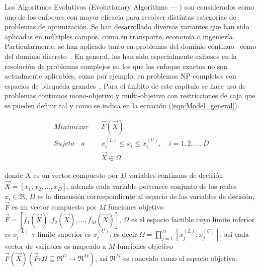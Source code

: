 Los Algoritmos Evolutivos (Evolutionary Algorithms --- \EAS{}) son considerados como uno de los enfoques con mayor eficacia para resolver distintas categorías de 
problemas de optimización.
%
Se han desarrollado diversas variantes que han sido aplicadas en múltiples campos, como en transporte, economía o ingeniería.
%
Particularmente, se han aplicado tanto en problemas del dominio continuo~\cite{glover2005handbook} como del dominio discreto~\cite{Joel:Dynamic_FAP}.
%
En general, los \EAS{} han sido especialmente exitosos en la resolución de problemas complejos en los que los enfoque exactos
no son actualmente aplicables, como por ejemplo, en problemas NP-completos con espacios de búsqueda grandes~\cite{chakraborty2008advances}.
% 
Para el ámbito de este capítulo se hace uso de problemas continuos mono-objetivo y multi-objetivo con restricciones de caja que se pueden definir 
tal y como se indica en la ecuación (\ref{eqn:Model_general}).

\begin{equation}
 \label{eqn:Model_general}
   \begin{split}
    Minimizar \quad & \vec{F}(\vec{X})\\
   Sujeto \quad a \quad &  x_i^{(L)} \leq x_i \leq x_i^{(U)}, \quad i=1,2,..., D \\
   & \vec{X} \in \Omega
   \end{split}
\end{equation}

donde $\vec{X}$ es un vector compuesto por $D$ variables continuas de decisión $\vec{X} = [x_1, x_2, ..., x_D]$, además cada variable pertenece conjunto de los reales $x_i \in \Re$,
$D$ es la dimensión correspondiente al espacio de las variables de decisión, $\vec{F}$ es un vector compuesto por $M$ funciones objetivo $\vec{F} = [f_1(\vec{X}), f_2(\vec{X}), ..., f_M(\vec{X})]$,
$\Omega$ es el espacio factible cuyo límite inferior es $x_i^{(L)}$ y límite superior es $x_i^{(U)}$, es decir $\Omega = \prod _{j=1}^D[x_j^{(L)}, x_j^{(U)}]$, así cada vector de variables es mapeado a $M$-funciones objetivo $\vec{F}(\vec{X})( \vec{F} : \Omega \subseteq \Re^D \rightarrow \Re^M)$, así $\Re^M$ es conocido como el espacio objetivo.

